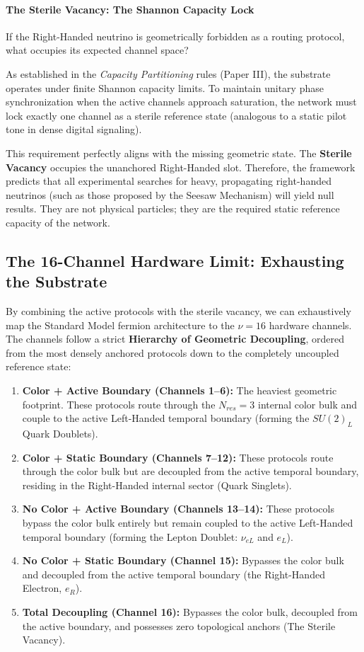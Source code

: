 \paragraph{The Sterile Vacancy: The Shannon Capacity Lock}

If the Right-Handed neutrino is geometrically forbidden as a routing protocol, what occupies its expected channel space? 

As established in the \textit{Capacity Partitioning} rules (Paper III), the substrate operates under finite Shannon capacity limits. To maintain unitary phase synchronization when the active channels approach saturation, the network must lock exactly one channel as a sterile reference state (analogous to a static pilot tone in dense digital signaling). 

This requirement perfectly aligns with the missing geometric state. The \textbf{Sterile Vacancy} occupies the unanchored Right-Handed slot. Therefore, the framework predicts that all experimental searches for heavy, propagating right-handed neutrinos (such as those proposed by the Seesaw Mechanism) will yield null results. They are not physical particles; they are the required static reference capacity of the network.

\subsection{The 16-Channel Hardware Limit: Exhausting the Substrate}
\label{sec:enumeration_table}

By combining the active protocols with the sterile vacancy, we can exhaustively map the Standard Model fermion architecture to the $\nu=16$ hardware channels. The channels follow a strict \textbf{Hierarchy of Geometric Decoupling}, ordered from the most densely anchored protocols down to the completely uncoupled reference state:

\begin{enumerate}
    \item \textbf{Color + Active Boundary (Channels 1--6):} The heaviest geometric footprint. These protocols route through the $N_{res}=3$ internal color bulk and couple to the active Left-Handed temporal boundary (forming the $SU(2)_L$ Quark Doublets).
    \item \textbf{Color + Static Boundary (Channels 7--12):} These protocols route through the color bulk but are decoupled from the active temporal boundary, residing in the Right-Handed internal sector (Quark Singlets).
    \item \textbf{No Color + Active Boundary (Channels 13--14):} These protocols bypass the color bulk entirely but remain coupled to the active Left-Handed temporal boundary (forming the Lepton Doublet: $\nu_{eL}$ and $e_L$).
    \item \textbf{No Color + Static Boundary (Channel 15):} Bypasses the color bulk and decoupled from the active temporal boundary (the Right-Handed Electron, $e_R$).
    \item \textbf{Total Decoupling (Channel 16):} Bypasses the color bulk, decoupled from the active boundary, and possesses zero topological anchors (The Sterile Vacancy).
\end{enumerate}

